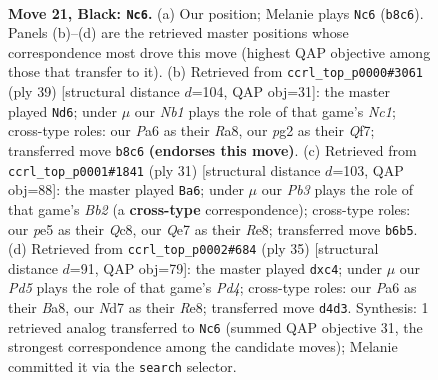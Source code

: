 \documentclass[11pt]{article}
\begin{document}
\clearpage

\begin{figure}[p]\centering
\begin{subfigure}{0.46\textwidth}\centering
\resizebox{\linewidth}{!}{%
\newchessgame
\chessboard[
  setfen={rnb1rk2/3nq2p/pp2p1p1/2p1P3/P2p4/2P5/1P1Q1PPP/1KN1RBNR b - - 0 21},
  showmover=false,
  pgfstyle=straightmove, color=movearrow, markmove={b8-c6}
]}
\caption{}
\end{subfigure}\hfill
\begin{subfigure}{0.46\textwidth}\centering
\resizebox{\linewidth}{!}{%
\newchessgame
\chessboard[
  setfen={r1n2rk1/1p3qpp/1np2p2/p2p4/P2P4/4P2P/1PQNNPP1/R3R1K1 b - - 3 20},
  showmover=false,
  pgfstyle=straightmove, color=movearrow, markmove={c8-d6}
]}
\caption{}
\end{subfigure}
\\[4pt]
\begin{subfigure}{0.46\textwidth}\centering
\resizebox{\linewidth}{!}{%
\newchessgame
\chessboard[
  setfen={r1q1r1k1/pb1n1pp1/1p3n1p/2pp4/3P2PB/P3PP2/1PQ1NK1P/3R1B1R b - - 0 16},
  showmover=false,
  pgfstyle=straightmove, color=movearrow, markmove={b7-a6}
]}
\caption{}
\end{subfigure}\hfill
\begin{subfigure}{0.46\textwidth}\centering
\resizebox{\linewidth}{!}{%
\newchessgame
\chessboard[
  setfen={b2qr1k1/r1pn1pp1/1p2pn1p/3p4/P1PP4/6P1/1BQNPPBP/R3R1K1 b - - 1 18},
  showmover=false,
  pgfstyle=straightmove, color=movearrow, markmove={d5-c4}
]}
\caption{}
\end{subfigure}
\caption{\textbf{Move 21, Black: \texttt{Nc6}.} (a) Our position; Melanie plays \texttt{Nc6} (\texttt{b8c6}). Panels (b)--(d) are the retrieved master positions whose correspondence most drove this move (highest QAP objective among those that transfer to it). (b) Retrieved from \texttt{ccrl\_top\_p0000\#3061} (ply 39) [structural distance $d$=104, QAP obj=31]: the master played \texttt{Nd6}; under $\mu$ our \emph{Nb1} plays the role of that game's \emph{Nc1}; cross-type roles: our \emph{P}a6 as their \emph{R}a8, our \emph{p}g2 as their \emph{Q}f7; transferred move \texttt{b8c6} \textbf{(endorses this move)}. (c) Retrieved from \texttt{ccrl\_top\_p0001\#1841} (ply 31) [structural distance $d$=103, QAP obj=88]: the master played \texttt{Ba6}; under $\mu$ our \emph{Pb3} plays the role of that game's \emph{Bb2} (a \textbf{cross-type} correspondence); cross-type roles: our \emph{p}e5 as their \emph{Q}c8, our \emph{Q}e7 as their \emph{R}e8; transferred move \texttt{b6b5}. (d) Retrieved from \texttt{ccrl\_top\_p0002\#684} (ply 35) [structural distance $d$=91, QAP obj=79]: the master played \texttt{dxc4}; under $\mu$ our \emph{Pd5} plays the role of that game's \emph{Pd4}; cross-type roles: our \emph{P}a6 as their \emph{B}a8, our \emph{N}d7 as their \emph{R}e8; transferred move \texttt{d4d3}. Synthesis: 1 retrieved analog transferred to \texttt{Nc6} (summed QAP objective 31, the strongest correspondence among the candidate moves); Melanie committed it via the \texttt{search} selector.}
\label{fig:thought-m41}
\end{figure}
\end{document}
